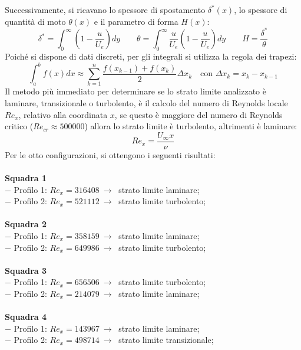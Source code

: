 \noindent Successivamente, si ricavano lo spessore di spostamento $\delta^*(x)$, lo spessore di quantità di moto $\theta(x)$ e il parametro di forma $H(x)$:
\begin{equation*}
    \delta^* = \int_0^\infty \left(1-\frac{u}{U_e}\right)dy \qquad \theta = \int_0^\infty \frac{u}{U_e}\left(1-\frac{u}{U_e}\right)dy \qquad H = \frac{\delta^*}{\theta}
\end{equation*}
Poiché si dispone di dati discreti, per gli integrali si utilizza la regola dei trapezi:
\begin{equation*}
    \int_a^b f(x)dx \approx \sum_{k=1}^n \frac{f(x_{k-1}) + f(x_k)}2 \Delta x_k \quad \text{con } \Delta x_k = x_k - x_{k-1}
\end{equation*}
Il metodo più immediato per determinare se lo strato limite analizzato è laminare, transizionale o turbolento, è il calcolo del numero di Reynolds locale $Re_x$, relativo alla coordinata $x$, se questo è maggiore del numero di Reynolds critico ($Re_{cr}\approx500000$) allora lo strato limite è turbolento, altrimenti è laminare:
\begin{equation*}
    Re_x = \frac{U_\infty x}\nu
\end{equation*}
Per le otto configurazioni, si ottengono i seguenti risultati:\\\\
\textbf{Squadra 1}\\
$-$ Profilo 1: $Re_x=316408\ \rightarrow\ $ strato limite laminare;\\
$-$ Profilo 2: $Re_x=521112\ \rightarrow\ $ strato limite turbolento;\\\\
\textbf{Squadra 2}\\
$-$ Profilo 1: $Re_x=358159\ \rightarrow\ $ strato limite laminare;\\
$-$ Profilo 2: $Re_x=649986\ \rightarrow\ $ strato limite turbolento;\\\\
\textbf{Squadra 3}\\
$-$ Profilo 1: $Re_x=656506\ \rightarrow\ $ strato limite turbolento;\\
$-$ Profilo 2: $Re_x=214079\ \rightarrow\ $ strato limite laminare;\\\\
\textbf{Squadra 4}\\
$-$ Profilo 1: $Re_x=143967\ \rightarrow\ $ strato limite laminare;\\
$-$ Profilo 2: $Re_x=498714\ \rightarrow\ $ strato limite transizionale;\\\\
